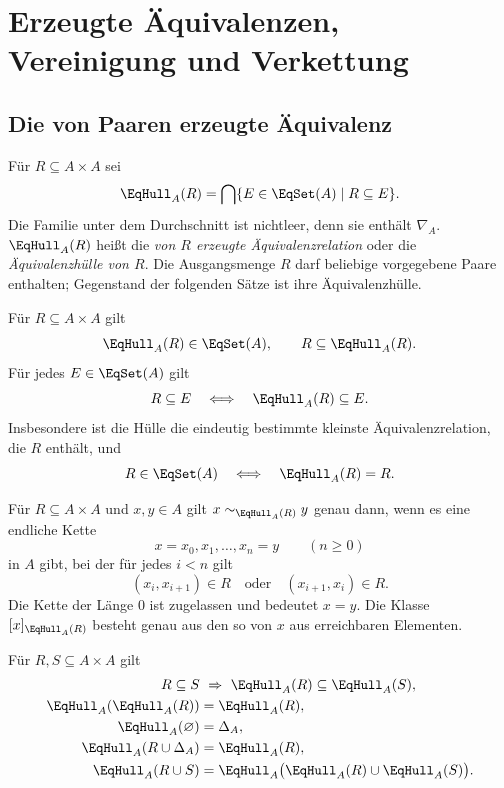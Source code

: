 \chapter{Erzeugte Äquivalenzen, Vereinigung und Verkettung}
\label{b11guide:ch:generated}

\section{Die von Paaren erzeugte Äquivalenz}

\begin{definition}
\label{b11guide:def:generated}
Für $R\subseteq A\times A$ sei
\[
 \EqHull_A(R)=
 \bigcap\{E\in\EqSet(A)\mid R\subseteq E\}.
\]
Die Familie unter dem Durchschnitt ist nichtleer, denn sie
enthält $\nabla_A$.
$\EqHull_A(R)$ heißt die \emph{von $R$ erzeugte
Äquivalenzrelation} oder die \emph{Äquivalenzhülle von $R$}.
Die Ausgangsmenge $R$ darf beliebige vorgegebene Paare enthalten;
Gegenstand der folgenden Sätze ist ihre Äquivalenzhülle.
\end{definition}

\begin{theorem}
\label{b11guide:thm:hull}
Für $R\subseteq A\times A$ gilt
\[
 \EqHull_A(R)\in\EqSet(A),\qquad R\subseteq\EqHull_A(R).
\]
Für jedes $E\in\EqSet(A)$ gilt
\[
 R\subseteq E\quad\Longleftrightarrow\quad\EqHull_A(R)\subseteq E.
\]
Insbesondere ist die Hülle die eindeutig bestimmte kleinste
Äquivalenzrelation, die $R$ enthält, und
\[
 R\in\EqSet(A)\quad\Longleftrightarrow\quad\EqHull_A(R)=R.
\]
\end{theorem}

\begin{theorem}
\label{b11guide:thm:chains}
Für $R\subseteq A\times A$ und $x,y\in A$ gilt
$x\sim_{\EqHull_A(R)}y$ genau dann, wenn es eine endliche Kette
\[
 x=x_0,x_1,\ldots,x_n=y\qquad(n\geq0)
\]
in $A$ gibt, bei der für jedes $i<n$ gilt
\[
 (x_i,x_{i+1})\in R\quad\text{oder}\quad(x_{i+1},x_i)\in R.
\]
Die Kette der Länge $0$ ist zugelassen und bedeutet $x=y$.
Die Klasse $[x]_{\EqHull_A(R)}$ besteht genau aus den so von $x$
aus erreichbaren Elementen.
\end{theorem}

\begin{theorem}
Für $R,S\subseteq A\times A$ gilt
\[
\begin{aligned}
 R\subseteq S&\ \Rightarrow\ \EqHull_A(R)\subseteq\EqHull_A(S),\\
 \EqHull_A(\EqHull_A(R))&=\EqHull_A(R),\\
 \EqHull_A(\varnothing)&=\Delta_A,\\
 \EqHull_A(R\cup\Delta_A)&=\EqHull_A(R),\\
 \EqHull_A(R\cup S)
   &=\EqHull_A\bigl(\EqHull_A(R)\cup\EqHull_A(S)\bigr).
\end{aligned}
\]
\end{theorem}

